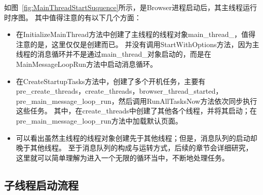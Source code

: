 如图~\ref{fig:MainThreadStartSuquence}所示，是Browser进程启动后，其主线程运行时序图。
其中值得注意的有以下几个方面：
\begin{itemize}
  \item 在InitializeMainThread方法中创建了主线程的线程对象main\_thread\_，值得注意的是，这里仅仅是创建而已。
  并没有调用StartWithOptions方法，因为主线程的消息循环并不是通过main\_thread\_对象启动的，而是在MainMessageLoopRun方法中启动消息循环。
  \item 在CreateStartupTasks方法中，创建了多个开机任务，主要有pre\_create\_threads，create\_threads，browser\_thread\_started，
  pre\_main\_message\_loop\_run，然后调用RunAllTasksNow方法依次同步执行这些任务。
  其中，在create_threads中创建了其他各个线程，并将其启动；在pre\_main\_message\_loop\_run方法中加载默认页面。
  \item 可以看出虽然主线程的线程对象创建先于其他线程；但是，消息队列的启动却晚于其他线程。
  至于消息队列的构成与运转方式，后续的章节会详细研究，这里就可以简单理解为进入一个无限的循环当中，不断地处理任务。
\end{itemize}

\subsection{子线程启动流程}



%
%
%
